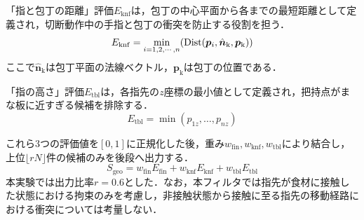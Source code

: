 「指と包丁の距離」評価$E_{\mathrm{knf}}$は，包丁の中心平面から各{\namefingerpoint}までの最短距離として定義され，切断動作中の手指と包丁の衝突を防止する役割を担う．
\begin{equation}
E_{\mathrm{knf}} = \min_{i=1,2,\cdots,n}(\mathrm{Dist}(\equfingerpoint[][i], \hat{\bm{n}}_{\mathrm{k}}, \bm{p}_{\mathrm{k}}))
\end{equation}
ここで$\hat{\bm{n}}_{\mathrm{k}}$は包丁平面の法線ベクトル，$\bm{p}_{\mathrm{k}}$は包丁の位置である．

「指の高さ」評価$E_{\mathrm{tbl}}$は，各指先の$z$座標の最小値として定義され，把持点がまな板に近すぎる候補を排除する．
\begin{equation}
E_{\mathrm{tbl}} = \min(p_{1z},\ldots,p_{nz})
\end{equation}

これら3つの評価値を$[0,1]$に正規化した後，重み$w_{\mathrm{fin}}, w_{\mathrm{knf}}, w_{\mathrm{tbl}}$により結合し，上位$\lfloor rN\rfloor$件の候補のみを後段へ出力する．
\begin{equation}
    S_{\mathrm{geo}} = w_{\mathrm{fin}} E_{\mathrm{fin}} + w_{\mathrm{knf}} E_{\mathrm{knf}} + w_{\mathrm{tbl}} E_{\mathrm{tbl}}
    \label{equ:holding_score_geo}
\end{equation}
本実験では出力比率$r=0.6$とした．なお，本フィルタでは指先が食材に接触した状態における拘束のみを考慮し，非接触状態から接触に至る指先の移動経路における衝突については考量しない．

